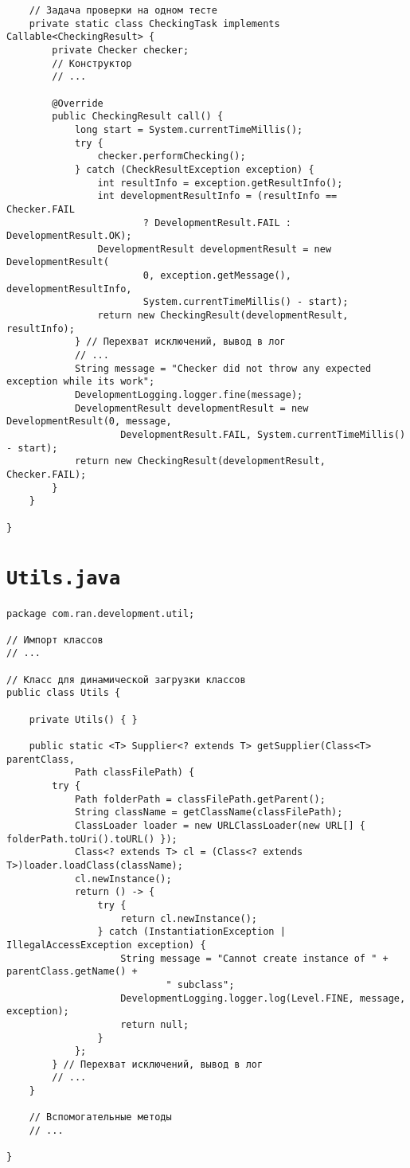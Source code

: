 \begin{verbatim}
    // Задача проверки на одном тесте
    private static class CheckingTask implements Callable<CheckingResult> {
        private Checker checker;
        // Конструктор
        // ...

        @Override
        public CheckingResult call() {
            long start = System.currentTimeMillis();
            try {
                checker.performChecking();
            } catch (CheckResultException exception) {
                int resultInfo = exception.getResultInfo();
                int developmentResultInfo = (resultInfo == Checker.FAIL
                        ? DevelopmentResult.FAIL : DevelopmentResult.OK);
                DevelopmentResult developmentResult = new DevelopmentResult(
                        0, exception.getMessage(), developmentResultInfo,
                        System.currentTimeMillis() - start);
                return new CheckingResult(developmentResult, resultInfo);
            } // Перехват исключений, вывод в лог
            // ...
            String message = "Checker did not throw any expected exception while its work";
            DevelopmentLogging.logger.fine(message);
            DevelopmentResult developmentResult = new DevelopmentResult(0, message,
                    DevelopmentResult.FAIL, System.currentTimeMillis() - start);
            return new CheckingResult(developmentResult, Checker.FAIL);
        }
    }

}
\end{verbatim}

\section*{\texttt{Utils.java}}
\begin{verbatim}
package com.ran.development.util;

// Импорт классов
// ...

// Класс для динамической загрузки классов
public class Utils {

    private Utils() { }
    
    public static <T> Supplier<? extends T> getSupplier(Class<T> parentClass,
            Path classFilePath) {
        try {
            Path folderPath = classFilePath.getParent();
            String className = getClassName(classFilePath);
            ClassLoader loader = new URLClassLoader(new URL[] { folderPath.toUri().toURL() });
            Class<? extends T> cl = (Class<? extends T>)loader.loadClass(className);
            cl.newInstance();
            return () -> {
                try {
                    return cl.newInstance();
                } catch (InstantiationException | IllegalAccessException exception) {
                    String message = "Cannot create instance of " + parentClass.getName() +
                            " subclass";
                    DevelopmentLogging.logger.log(Level.FINE, message, exception);
                    return null;
                }
            };
        } // Перехват исключений, вывод в лог
        // ...
    }
    
    // Вспомогательные методы
    // ...
    
}
\end{verbatim}